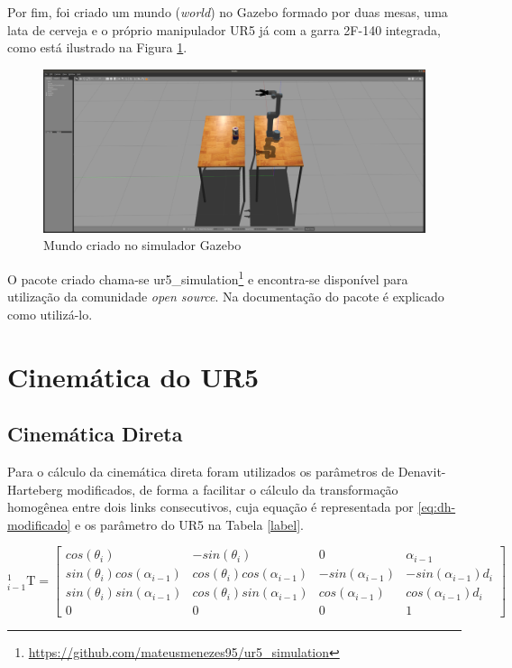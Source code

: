 Por fim, foi criado um mundo (\textit{world}) no Gazebo formado por duas mesas, uma lata de
cerveja e o próprio manipulador UR5 já com a garra 2F-140 integrada, como está ilustrado na
Figura \ref{fig:gazebo-world}.

\begin{figure}[h]
	\centering
	\caption{Mundo criado no simulador Gazebo}
	\label{fig:gazebo-world}
	\includegraphics[width=\textwidth]{images/gazebo_world.png}
\end{figure}

O pacote criado chama-se ur5\_simulation\footnote{\url{https://github.com/mateusmenezes95/ur5_simulation}}
e encontra-se disponível para utilização da comunidade \textit{open source}. Na documentação do
pacote é explicado como utilizá-lo.

\section{Cinemática do UR5}

\subsection{Cinemática Direta}
\label{ssec:cinematica-direta}

Para o cálculo da cinemática direta foram utilizados os parâmetros de Denavit-Harteberg modificados, de forma a facilitar o cálculo da transformação homogênea entre dois links consecutivos, cuja equação é representada por \ref{eq:dh-modificado} e os parâmetro do UR5 na Tabela \ref{label}.

\begin{equation}\label{eq:dh-modificado}
_{i-1}^{1}\textrm{T}=\begin{bmatrix}
cos(\theta_i) & -sin(\theta_i) & 0 & \alpha _{i-1}\\ 
sin(\theta_i)cos(\alpha _{i-1})& cos(\theta_i)cos(\alpha _{i-1})  & -sin(\alpha _{i-1}) & -sin(\alpha _{i-1})d_i\\ 
sin(\theta_i)sin(\alpha _{i-1})&  cos(\theta_i)sin(\alpha _{i-1}) & cos(\alpha _{i-1}) & cos(\alpha _{i-1})d_i\\ 
0 & 0 & 0 & 1
\end{bmatrix}
\end{equation}

